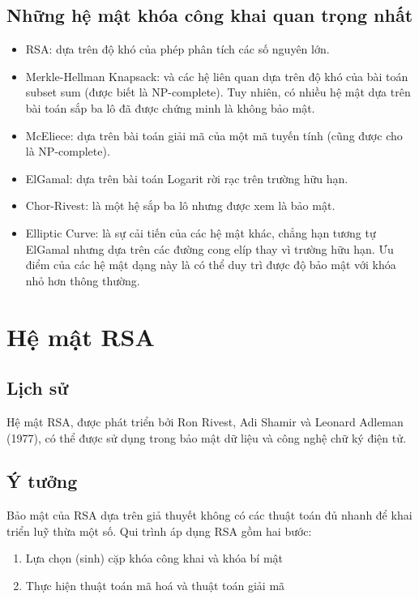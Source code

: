 \documentclass{article}
\begin{document}
\subsection{Những hệ mật khóa công khai quan trọng nhất}
\begin{itemize}
    \item  RSA: dựa trên độ khó của phép phân tích các số nguyên lớn.
    \item   Merkle-Hellman Knapsack: và các hệ liên quan dựa trên độ khó của bài toán subset sum (được biết là NP-complete). Tuy nhiên, có nhiều hệ mật dựa trên bài toán sắp ba lô đã được chứng minh là không bảo mật.
    \item    McEliece: dựa trên bài toán giải mã của một mã tuyến tính (cũng được cho là NP-complete).
    \item     ElGamal: dựa trên bài toán Logarit rời rạc trên trường hữu hạn.
    \item      Chor-Rivest: là một hệ sắp ba lô nhưng được xem là bảo mật.
    \item       Elliptic Curve: là sự cải tiến của các hệ mật khác, chẳng hạn tương tự ElGamal nhưng dựa trên các đường cong elíp thay vì trường hữu hạn. Ưu điểm của các hệ mật dạng này là có thể duy trì được độ bảo mật với khóa nhỏ hơn thông thường.
\end{itemize}

\section{Hệ mật RSA}
\subsection{Lịch sử}
Hệ mật RSA, được phát triển bởi Ron Rivest, Adi Shamir và Leonard Adleman (1977), có thể được sử dụng trong bảo mật dữ liệu và công nghệ chữ ký điện tử.
\subsection{Ý tưởng}
Bảo mật của RSA dựa trên giả thuyết không có các thuật toán đủ nhanh để khai triển luỹ thừa một số. Qui trình áp dụng RSA gồm hai bước:
\begin{enumerate}
    \item  Lựa chọn (sinh) cặp khóa công khai và khóa bí mật
    \item   Thực hiện thuật toán mã hoá và thuật toán giải mã
\end{enumerate}
\end{document}
